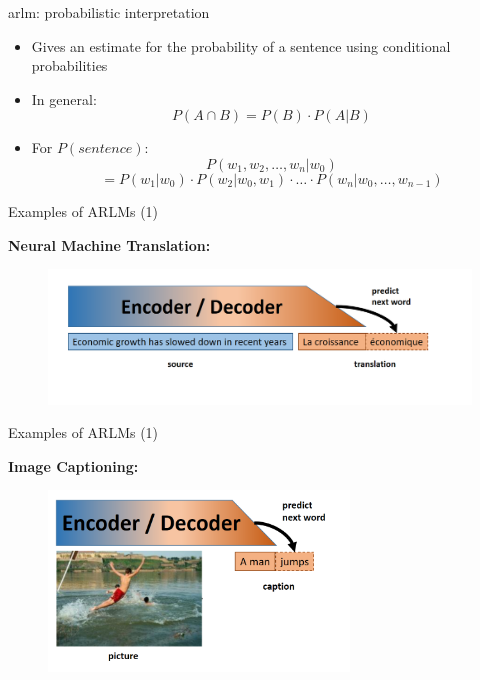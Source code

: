 \begin{vbframe}{arlm: probabilistic interpretation}

\vfill

\begin{itemize}
	\item Gives an estimate for the probability of a sentence using conditional probabilities
	\item In general: $$ P(A \cap B) = P(B) \cdot P(A | B)$$
	\item For $P(sentence)$:
	$$ P(w_1, w_2, \dots, w_n | w_0)$$ $$ = P(w_1 | w_0) \cdot P(w_2 | w_0, w_1) \cdot \hdots \cdot P(w_n | w_0, \dots, w_{n-1})$$
\end{itemize}

\vfill

\end{vbframe}



\begin{vbframe}{Examples of ARLMs (1)}

\vfill

\textbf{Neural Machine Translation:}

	\begin{figure}
		\centering
		\includegraphics[width=12cm]{figure/arlm1.png}
	\end{figure}
	
\vfill

\end{vbframe}


\begin{vbframe}{Examples of ARLMs (1)}

\vfill

\textbf{Image Captioning:}

	\begin{figure}
		\centering
		\includegraphics[width=8cm]{figure/arlm2.png}
	\end{figure}
\vfill

\end{vbframe}

